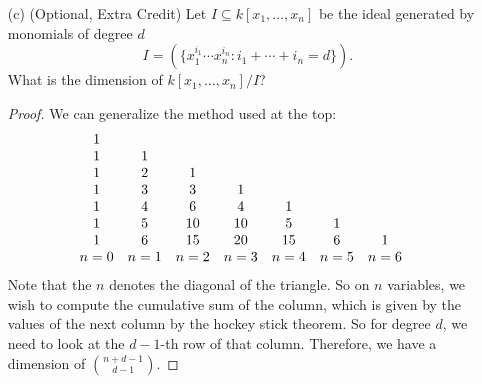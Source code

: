 \documentclass{article}
\begin{document}
\begin{itemize}
        \item [(c)] (Optional, Extra Credit) Let $I \subseteq k[x_{1}, \ldots , x_{n}]$ be the ideal generated by monomials of degree $d$
            \begin{equation*}
                I = (\{x_{1}^{i_{1}} \cdots x_{n}^{i_{n}} : i_{1} + \cdots +i_{n} = d\}).
            \end{equation*}
        What is the dimension of $k[x_{1}, \ldots , x_{n}]/I$?

            \begin{proof}
                We can generalize the method used at the top:
                    \begin{align*}
                        \begin{array}{ c c c c c c c c }
                            1     &       &       &       &       &       &       &  \\
                            1     & 1     &       &       &       &       &       &  \\
                            1     & 2     & 1     &       &       &       &       &  \\
                            1     & 3     & 3     & 1     &       &       &       &  \\
                            1     & 4     & 6     & 4     & 1     &       &       &  \\
                            1     & 5     & 10    & 10    & 5     & 1     &       &  \\
                            1     & 6     & 15    & 20    & 15    & 6     & 1     &  \\
                            n = 0 & n = 1 & n = 2 & n = 3 & n = 4 & n = 5 & n = 6 &    
                        \end{array}
                    \end{align*}
                Note that the $n$ denotes the diagonal of the triangle. So on $n$ variables, we wish to compute the cumulative sum of the column, which is given by the values of the next column by the hockey stick theorem. So for degree $d$, we need to look at the $d - 1$-th row of that column. Therefore, we have a dimension of $\binom{n + d - 1}{d - 1}$. 
            \end{proof}
    \end{itemize}
\end{document}
